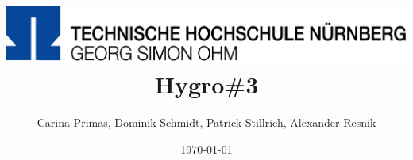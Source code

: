 \title{
\includegraphics{./Einleitung/Titelseite/TH_Nuernberg_RGB}\newline\\Hygro\#3}
\author{Carina Primas, Dominik Schmidt, Patrick Stillrich, Alexander Resnik}
\date{\today} 
\maketitle
\thispagestyle{empty}